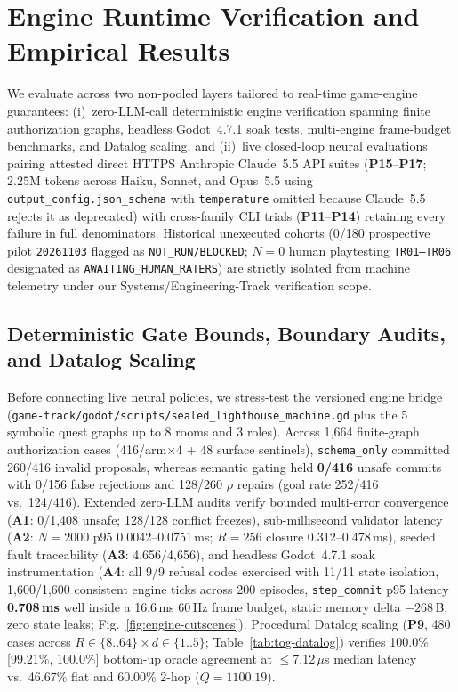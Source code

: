 \section{Engine Runtime Verification and Empirical Results}\label{sec:eval}
We evaluate \system{} across two non-pooled layers tailored to real-time game-engine guarantees: (i)~zero-LLM-call deterministic engine verification spanning finite authorization graphs, headless Godot~4.7.1 soak tests, multi-engine frame-budget benchmarks, and Datalog scaling, and (ii)~live closed-loop neural evaluations pairing attested direct HTTPS Anthropic Claude~5.5 API suites (\textbf{P15}--\textbf{P17}; $2.25\text{M}$ tokens across Haiku, Sonnet, and Opus~5.5 using \texttt{output\_config.json\_schema} with \texttt{temperature} omitted because Claude~5.5 rejects it as deprecated) with cross-family CLI trials (\textbf{P11}--\textbf{P14}) retaining every failure in full denominators. Historical unexecuted cohorts (0/180 prospective pilot \texttt{20261103} flagged as \texttt{NOT\_RUN/BLOCKED}; $N{=}0$ human playtesting \texttt{TR01--TR06} designated as \texttt{AWAITING\_HUMAN\_RATERS}) are strictly isolated from machine telemetry under our Systems/Engineering-Track verification scope.

\subsection{Deterministic Gate Bounds, Boundary Audits, and Datalog Scaling}\label{sec:tog-det}
Before connecting live neural policies, we stress-test the versioned engine bridge (\texttt{game-track/godot/scripts/sealed\_\allowbreak lighthouse\_\allowbreak machine.gd} plus the 5 symbolic quest graphs up to 8 rooms and 3 roles). Across 1,664 finite-graph authorization cases (416/arm$\times$4 + 48 surface sentinels), \texttt{schema\_only} committed 260/416 invalid proposals, whereas semantic gating held \textbf{0/416} unsafe commits with 0/156 false rejections and 128/260 $\rho$ repairs (goal rate 252/416 vs.\ 124/416). Extended zero-LLM audits verify bounded multi-error convergence (\textbf{A1}: 0/1,408 unsafe; 128/128 conflict freezes), sub-millisecond validator latency (\textbf{A2}: $N{=}2000$ p95 0.0042--0.0751\,ms; $R{=}256$ closure 0.312--0.478\,ms), seeded fault traceability (\textbf{A3}: 4,656/4,656), and headless Godot~4.7.1 soak instrumentation (\textbf{A4}: all 9/9 refusal codes exercised with 11/11 state isolation, 1,600/1,600 consistent engine ticks across 200 episodes, \texttt{step\_commit} p95 latency \textbf{0.708\,ms} well inside a 16.6\,ms 60\,Hz frame budget, static memory delta $-268$\,B, zero state leaks; Fig.~\ref{fig:engine-cutscenes}). Procedural Datalog scaling (\textbf{P9}, 480 cases across $R\in\{8..64\} \times d\in\{1..5\}$; Table~\ref{tab:tog-datalog}) verifies 100.0\% [99.21\%, 100.0\%] bottom-up oracle agreement at $\le$7.12\,$\mu$s median latency vs.\ 46.67\% flat and 60.00\% 2-hop ($Q{=}1100.19$).

